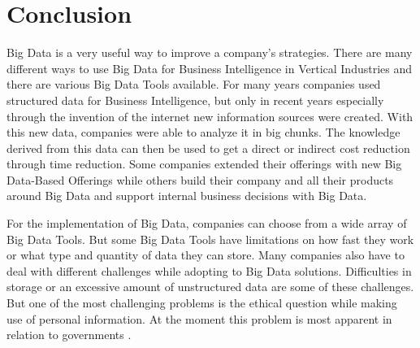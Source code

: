 \documentclass[runningheads]{llncs}
\begin{document}
\section{Conclusion}
Big Data is a very useful way to improve a company's strategies. There are many different ways to use Big Data for Business Intelligence in Vertical Industries and there are various Big Data Tools available. For many years companies used structured data for Business Intelligence, but only in recent years especially through the invention of the internet new information sources were created. With this new data, companies were able to analyze it in big chunks. The knowledge derived from this data can then be used to get a direct or indirect cost reduction through time reduction. Some companies extended their offerings with new Big Data-Based Offerings while others build their company and all their products around Big Data and support internal business decisions with Big Data. 

For the implementation of Big Data, companies can choose from a wide array of Big Data Tools. But some Big Data Tools have limitations on how fast they work or what type and quantity of data they can store.
Many companies also have to deal with different challenges while adopting to Big Data solutions. Difficulties in storage or an excessive amount of unstructured data are some of these challenges. But one of the most challenging problems is the ethical question while making use of personal information. At the moment this problem is most apparent in relation to governments \cite{ZEIT}.



\end{document}
